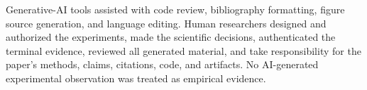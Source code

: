 Generative-AI tools assisted with code review, bibliography formatting, figure
source generation, and language editing. Human researchers designed and
authorized the experiments, made the scientific decisions, authenticated the
terminal evidence, reviewed all generated material, and take responsibility for
the paper's methods, claims, citations, code, and artifacts. No AI-generated
experimental observation was treated as empirical evidence.
